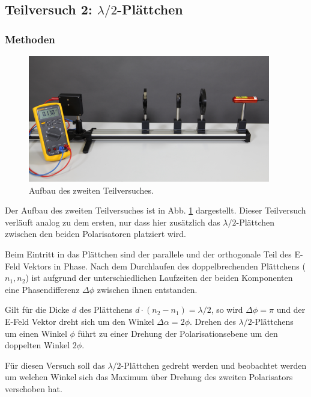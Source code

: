\subsection{Teilversuch 2: $ \lambda  / 2 $-Plättchen}

	\subsubsection*{Methoden}
		
		\begin{figure}[ht]
			\centering
			\includegraphics[width=\textwidth]{bilder/LambdaHalbe.png}
			\caption{Aufbau des zweiten Teilversuches.\cite{WWU}}
			\label{fig:LambdaHalbe}	
		\end{figure}
		Der Aufbau des zweiten Teilversuches ist in Abb. \ref{fig:LambdaHalbe} dargestellt.
		Dieser Teilversuch verläuft analog zu dem ersten, nur dass hier zusätzlich das $\lambda/2$-Plättchen zwischen den beiden Polarisatoren platziert wird.
		
		Beim Eintritt in das Plättchen sind der parallele und der orthogonale Teil des E-Feld Vektors in Phase. 
		Nach dem Durchlaufen des doppelbrechenden Plättchens ($n_1 , n_2$) ist aufgrund der unterschiedlichen Laufzeiten der beiden Komponenten eine Phasendifferenz $\Delta\phi$ zwischen ihnen entstanden.
		
		Gilt für die Dicke $d$ des Plättchens $d\cdot(n_2-n_1)=\lambda/2$, so wird $\Delta\phi=\pi$ und der E-Feld Vektor dreht sich um den Winkel $\Delta\alpha = 2\phi$.
		Drehen des $\lambda/2$-Plättchens um einen Winkel $\phi$ führt zu einer Drehung der Polarisationsebene um den doppelten Winkel $2\phi$.
		
		Für diesen Versuch soll das $\lambda/2$-Plättchen gedreht werden und beobachtet werden um welchen Winkel sich das Maximum über Drehung des zweiten Polarisators verschoben hat.
		
